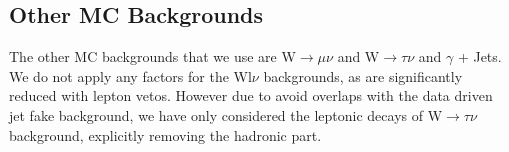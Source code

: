 \subsection{Other MC Backgrounds}

The other MC backgrounds that we use are W$\to \mu\nu$ and W$\to \tau\nu$ and $\gamma$ + Jets. We do not apply any factors for the Wl$\nu$ backgrounds, as are significantly reduced with lepton vetos. However due to avoid overlaps with the data driven jet fake background, we have only considered the leptonic decays of W$\to \tau\nu$ background, explicitly removing the hadronic part. 
